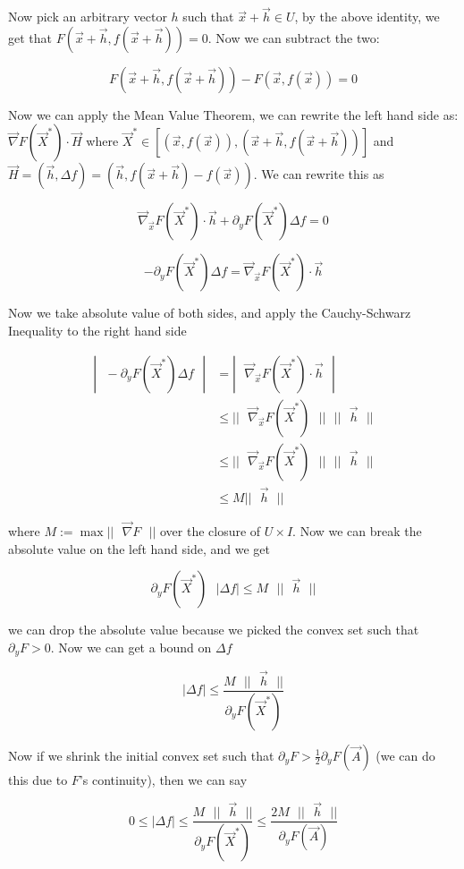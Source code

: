 \documentclass [12 pt, twoside] {book}
\newcommand\+{\text{ }}
\newcommand{\gradient}{\vec{\nabla}}
\begin{document}
Now pick an arbitrary vector $h$ such that $\vec{x} + \vec{h} \in U$, by the
above identity, we get that $F(\vec{x} + \vec{h}, f(\vec{x} + \vec{h})) = 0$.
Now we can subtract the two:

$$F(\vec{x} + \vec{h}, f(\vec{x} + \vec{h})) - F(\vec{x}, f(\vec{x})) = 0$$

Now we can apply the Mean Value Theorem, we can rewrite the left hand side as:
$\gradient F(\vec{X}^*) \cdot \vec{H}$ where $\vec{X}^* \in [(\vec{x},
f(\vec{x})), (\vec{x} + \vec{h}, f(\vec{x} + \vec{h}))]$ and $\vec{H} =
(\vec{h}, \Delta f) = (\vec{h}, f(\vec{x} + \vec{h}) - f(\vec{x}))$. We can
rewrite this as

$$\gradient_{\vec{x}} F(\vec{X}^*) \cdot \vec{h} + \partial_y F(\vec{X}^*)
\Delta f = 0$$

$$- \partial_{y} F(\vec{X}^*) \Delta f = \gradient_{\vec{x}} F(\vec{X}^*) \cdot
\vec{h}$$

Now we take absolute value of both sides, and apply the Cauchy-Schwarz
Inequality to the right hand side

\begin{align*}
    |\+-\partial_{y} F(\vec{X}^*) \Delta f\+| &= |\+\gradient_{\vec{x}}
    F(\vec{X}^*) \cdot \vec{h}\+|\\
    &\leq ||\+\gradient_{\vec{x}} F(\vec{X}^*)\+||\+ ||\+\vec{h}\+||\\
    &\leq ||\+\gradient_{\vec{x}} F(\vec{X}^*)\+||\+ ||\+\vec{h}\+||\\
    &\leq M ||\+\vec{h}\+||
\end{align*}

where $M := \max ||\+\gradient F\+||$ over the closure of $U \times I$. Now we
can break the absolute value on the left hand side, and we get

$$\partial_y F(\vec{X}^*) \+ |\Delta f| \leq M \+ ||\+\vec{h}\+||$$

we can drop the absolute value because we picked the convex set such that
$\partial_y F > 0$. Now we can get a bound on $\Delta f$

$$|\Delta f| \leq \frac{M \+ ||\+\vec{h}\+||}{\partial_y F(\vec{X}^*)}$$

Now if we shrink the initial convex set such that $\partial_y F > \frac{1}{2}
\partial_y F(\vec{A})$ (we can do this due to $F$'s continuity), then we can say

$$0 \leq |\Delta f| \leq \frac{M \+ ||\+\vec{h}\+||}{\partial_y F(\vec{X}^*)}
\leq \frac{2M \+ ||\+\vec{h}\+||}{\partial_y F(\vec{A})}$$
\end{document}
